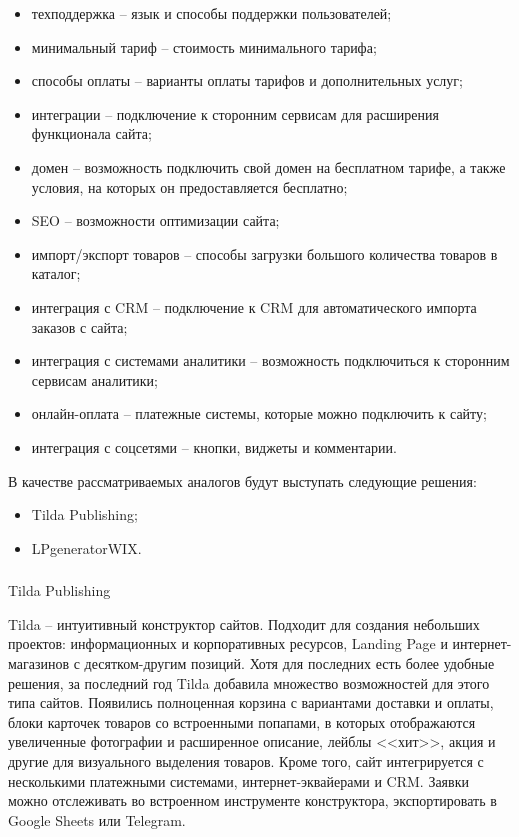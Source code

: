 \begin{itemize}
  \item техподдержка -- язык и способы поддержки пользователей;
  \item минимальный тариф -- стоимость минимального тарифа;
  \item способы оплаты -- варианты оплаты тарифов и дополнительных услуг;
  \item интеграции -- подключение к сторонним сервисам для расширения функционала сайта;
  \item домен -- возможность подключить свой домен на бесплатном тарифе, а также условия, на которых он предоставляется бесплатно;
  \item SEO -- возможности оптимизации сайта;
  \item импорт/экспорт товаров -- способы загрузки большого количества товаров в каталог;
  \item интеграция с CRM -- подключение к CRM для автоматического импорта заказов с сайта;
  \item интеграция с системами аналитики -- возможность подключиться к сторонним сервисам аналитики;
  \item онлайн-оплата -- платежные системы, которые можно подключить к сайту;
  \item интеграция с соцсетями -- кнопки, виджеты и комментарии.
\end{itemize}

В качестве рассматриваемых аналогов будут выступать следующие решения:
\begin{itemize}
  \item Tilda Publishing;
  \item LPgeneratorWIX.
\end{itemize}

\subsubsection{}Tilda Publishing
\

Tilda -- интуитивный конструктор сайтов. Подходит для создания небольших проектов: информационных и корпоративных ресурсов, Landing Page и интернет-магазинов с десятком-другим позиций. Хотя для последних есть более удобные решения, за последний год Tilda добавила множество возможностей для этого типа сайтов. Появились полноценная корзина с вариантами доставки и оплаты, блоки карточек товаров со встроенными попапами, в которых отображаются увеличенные фотографии и расширенное описание, лейблы <<хит>>, акция и другие для визуального выделения товаров. Кроме того, сайт интегрируется с несколькими платежными системами, интернет-эквайерами и CRM. Заявки можно отслеживать во встроенном инструменте конструктора, экспортировать в Google Sheets или Telegram.

